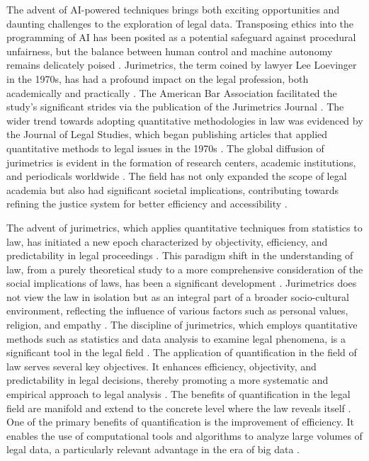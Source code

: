 The advent of AI-powered techniques brings both exciting opportunities and daunting challenges to the exploration of legal data. Transposing ethics into the programming of AI has been posited as a potential safeguard against procedural unfairness, but the balance between human control and machine autonomy remains delicately poised \cite{losano2006}. Jurimetrics, the term coined by lawyer Lee Loevinger in the 1970s, has had a profound impact on the legal profession, both academically and practically \cite{1023071190721}. The American Bar Association facilitated the study's significant strides via the publication of the Jurimetrics Journal \cite{1023071190721}. The wider trend towards adopting quantitative methodologies in law was evidenced by the Journal of Legal Studies, which began publishing articles that applied quantitative methods to legal issues in the 1970s \cite{1023071190721}. The global diffusion of jurimetrics is evident in the formation of research centers, academic institutions, and periodicals worldwide \cite{1023071190721}. The field has not only expanded the scope of legal academia but also had significant societal implications, contributing towards refining the justice system for better efficiency and accessibility \cite{1023071190721}.

The advent of jurimetrics, which applies quantitative techniques from statistics to law, has initiated a new epoch characterized by objectivity, efficiency, and predictability in legal proceedings \cite{supiot2017}. This paradigm shift in the understanding of law, from a purely theoretical study to a more comprehensive consideration of the social implications of laws, has been a significant development \cite{losano2006}. Jurimetrics does not view the law in isolation but as an integral part of a broader socio-cultural environment, reflecting the influence of various factors such as personal values, religion, and empathy \cite{losano2006}. The discipline of jurimetrics, which employs quantitative methods such as statistics and data analysis to examine legal phenomena, is a significant tool in the legal field \cite{ajah2021}. The application of quantification in the field of law serves several key objectives. It enhances efficiency, objectivity, and predictability in legal decisions, thereby promoting a more systematic and empirical approach to legal analysis \cite{101111/lsi12334, camargo2009}. The benefits of quantification in the legal field are manifold and extend to the concrete level where the law reveals itself \cite{camargo2009}. One of the primary benefits of quantification is the improvement of efficiency. It enables the use of computational tools and algorithms to analyze large volumes of legal data, a particularly relevant advantage in the era of big data \cite{sareenetal2020}.

